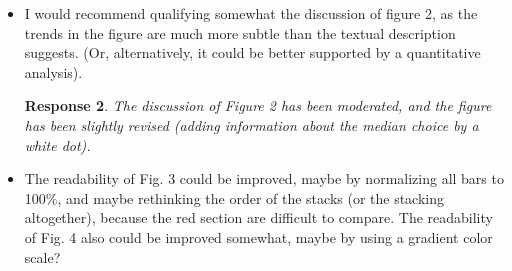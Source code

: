 \documentclass[a4paper]{article}
\newtheorem{response}{Response}
\newenvironment{robin}{\smallskip \noindent \color{red!10!green!50!blue}}{\color{black}\smallskip}
\newenvironment{tobo}{\smallskip \noindent \color{yellow!80!black!80}}{\color{black}\smallskip}
\begin{document}
\begin{itemize}
\begin{response}Yes, we intend to include more detailed comments in the scripts and codes when the paper is about to be finalized for publishing. A new R script for the mixed effects model has been included. \end{response}

\item I would recommend qualifying somewhat the discussion of figure 2, as the trends in the figure are much more subtle than the textual description suggests. (Or, alternatively, it could be better supported by a quantitative analysis).

\begin{response}
The discussion of Figure 2 has been moderated, and the figure has been slightly revised (adding information about the median choice by a white dot). 
\end{response}


\item The readability of Fig. 3 could be improved, maybe by normalizing all bars to 100\%, and maybe rethinking the order of the stacks (or the stacking altogether), because the red section are difficult to compare. The readability of Fig. 4 also could be improved somewhat, maybe by using a gradient color scale?


\end{itemize}
\end{document}
